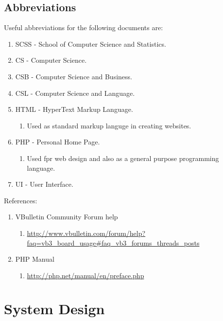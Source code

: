 \documentclass[a4paper, 12pt]{article}
\begin{document}
		\subsection{Abbreviations}
			\par Useful abbreviations for the following documents are:
			\begin{enumerate}[label*=\arabic*.]
				\item SCSS - School of Computer Science and Statistics.
				\item CS - Computer Science.
				\item CSB - Computer Science and Business.
				\item CSL - Computer Science and Language.
				\item HTML - HyperText Markup Language.
				\begin{enumerate}[label*=\arabic*.]
					\item Used as standard markup languge in creating websites.
				\end{enumerate}
				\item PHP - Personal Home Page.
				\begin{enumerate}[label*=\arabic*.]
					\item Used fpr web design and also as a general purpose programming language.
				\end{enumerate}
				\item UI - User Interface.
			\end{enumerate}
			\par References:
			\begin{enumerate}[label*=\arabic*.]
				\item VBulletin Community Forum help
				\begin{enumerate}[label*=\arabic*.]
					\item \url{http://www.vbulletin.com/forum/help?faq=vb3_board_usage#faq_vb3_forums_threads_posts}
				\end{enumerate}
				\item PHP Manual
				\begin{enumerate}[label*=\arabic*.]
					\item \url{http://php.net/manual/en/preface.php}
				\end{enumerate}
			\end{enumerate}
	\newpage
	\section{System Design}
\end{document}
